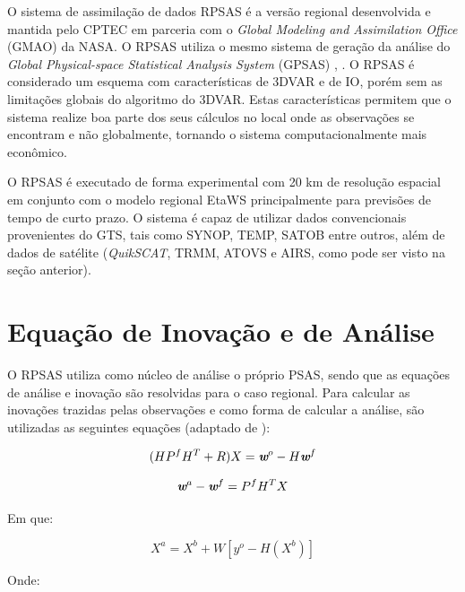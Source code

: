 O sistema de assimilação de dados RPSAS é a versão regional desenvolvida e mantida pelo CPTEC em parceria com o \textit{Global Modeling and Assimilation Office} (GMAO) da NASA. O RPSAS utiliza o mesmo sistema de geração da análise do \textit{Global Physical-space Statistical Analysis System} (GPSAS) \cite{dasilvaetal95}, \cite{cohnetal98}. O RPSAS é considerado um esquema com características de 3DVAR e de IO, porém sem as limitações globais do algoritmo do 3DVAR. Estas características permitem que o sistema realize boa parte dos seus cálculos no local onde as observações se encontram e não globalmente, tornando o sistema computacionalmente mais econômico. 

O RPSAS é executado de forma experimental com 20 km de resolução espacial em conjunto com o modelo regional EtaWS principalmente para previsões de tempo de curto prazo. O sistema é capaz de utilizar dados convencionais provenientes do GTS, tais como SYNOP, TEMP, SATOB entre outros, além de dados de satélite (\textit{QuikSCAT}, TRMM, ATOVS e AIRS, como pode ser visto na seção anterior).

\section{Equação de Inovação e de Análise}
\label{ss:eqinovanl}

O RPSAS utiliza como núcleo de análise o próprio PSAS, sendo que as equações de análise e inovação são resolvidas para o caso regional. Para calcular as inovações trazidas pelas observações e como forma de calcular a análise, são utilizadas as seguintes equações (adaptado de ):

\begin{equation}
(HP^{f}H^{T}+R)X=\textit{\textbf{w}}^o-H\textit{\textbf{w}}^f
\label{form06}
\end{equation}

\begin{equation}
\textit{\textbf{w}}^a-\textit{\textbf{w}}^f=P^{f}H^{T}X
\label{form07}
\end{equation}

Em que:

\begin{equation}
X^{a}=X^{b}+W[y^{o}-H(X^{b})]
\label{form08}
\end{equation}

Onde:

